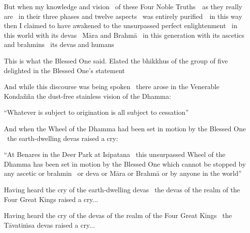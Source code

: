 \begin{english-only-hang}
  But when my knowledge and vision \breathmark\ of these Four Noble \mbox{Truths}~\breathmark\ as they really are \breathmark\ in their three phases and twelve aspects \breathmark\ was entirely \mbox{purified}~\breathmark\ in this way then I claimed to have awakened to the unsurpassed perfect enlightenment \breathmark\ in this world with its devas \breathmark\ Māra and Brahmā \breathmark\ in this generation with its ascetics and brahmins \breathmark\ its devas and humans
\end{english-only-hang}

\begin{english-only-hang}
  This is what the Blessed One said. Elated the bhikkhus of the group of five delighted in the Blessed One's statement
\end{english-only-hang}

\begin{english-only-hang}
  And while this discourse was being spoken \breathmark\ there arose in the Venerable Kondañña the dust-free stainless vision of the Dhamma:
\end{english-only-hang}

\begin{english-only-hang}
  ``Whatever is subject to origination is all subject to cessation''
\end{english-only-hang}

\begin{english-only-hang}
  And when the Wheel of the Dhamma had been set in motion by the Blessed One \breathmark\ the earth-dwelling devas raised a cry:
\end{english-only-hang}

\begin{english-only-hang}
  ``At Benares in the Deer Park at Isipatana \breathmark\ this unsurpassed Wheel of the Dhamma has been set in motion  by the Blessed One  which cannot be stopped by any ascetic or brahmin \breathmark\ or deva or Māra or Brahmā or by anyone in the world''
\end{english-only-hang}

\begin{english-only-hang}
  Having heard the cry of the earth-dwelling devas \breathmark\ the devas of the realm of the Four Great Kings raised a cry...
\end{english-only-hang}

\begin{english-only-hang}
  Having heard the cry of the devas of the realm of the Four Great Kings \breathmark\ the Tāvatiṁsa devas raised a cry...
\end{english-only-hang}

